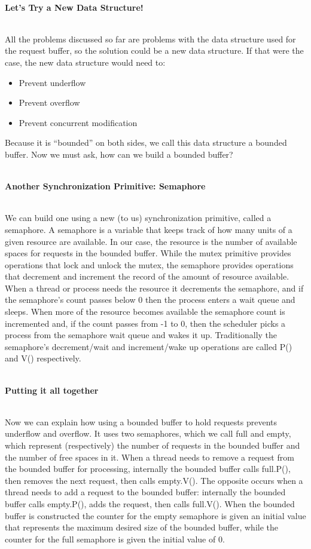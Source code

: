 \documentclass[12pt]{extarticle}
\newenvironment{myindentpar}[1]%
 {\begin{list}{}%
         {\setlength{\leftmargin}{#1}}%
         \item[]%
 }
 {\end{list}}
\begin{document}
\begin{myindentpar}{5mm}
	\ \\
    \textbf{Let's Try a New Data Structure!}
    
    \ \\
    All the problems discussed so far are problems with the data structure used for the request buffer, so the solution could be a new data structure. If that were the case, the new data structure would need to:
    \begin{itemize}
    	\setlength\itemsep{-0.1em}
    	\item Prevent underflow
    	\item Prevent overflow
    	\item Prevent concurrent modification
    \end{itemize}

	Because it is “bounded” on both sides, we call this data structure a bounded buffer. Now we must ask, how can we build a bounded buffer? 
	
	\ \\
    \textbf{Another Synchronization Primitive: Semaphore}
    
    \ \\
	We can build one using a new (to us) synchronization primitive, called a semaphore. A semaphore is a variable that keeps track of how many units of a given resource are available. In our case, the resource is the number of available spaces for requests in the bounded buffer. While the mutex primitive provides operations that lock and unlock the mutex, the semaphore provides operations that decrement and increment the record of the amount of resource available. When a thread or process needs the resource it decrements the semaphore, and if the semaphore’s count passes below 0 then the process enters a wait queue and sleeps. When more of the resource becomes available the semaphore count is incremented and, if the count passes from -1 to 0, then the scheduler picks a process from the semaphore wait queue and wakes it up. Traditionally the semaphore’s decrement/wait and increment/wake up operations are called P() and V() respectively. 

	\ \\
    \textbf{Putting it all together}
    
    \ \\
	Now we can explain how using a bounded buffer to hold requests prevents underflow and overflow. It uses two semaphores, which we call full and empty, which  represent (respectively) the number of requests in the bounded buffer and the number of free spaces in it. When a thread needs to remove a request from the bounded buffer for processing, internally the bounded buffer calls full.P(), then removes the next request, then calls empty.V(). The opposite occurs when a thread needs to add a request to the bounded buffer: internally the bounded buffer calls empty.P(), adds the request, then calls full.V(). When the bounded buffer is constructed the counter for the empty semaphore is given an initial value that represents the maximum desired size of the bounded buffer, while the counter for the full semaphore is given the initial value of 0. 
	

\end{myindentpar}
\end{document}
